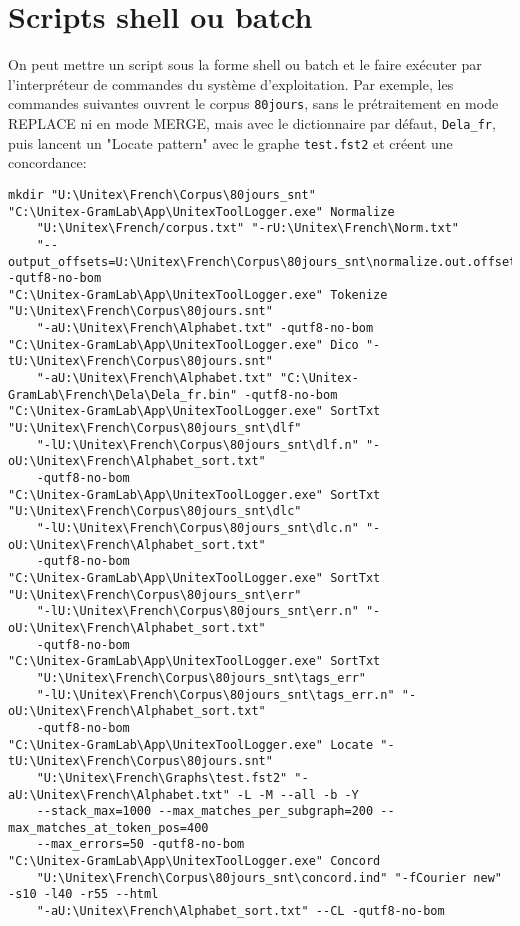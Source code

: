 \section{Scripts shell ou batch}
\label{section-batch}

On peut mettre un script sous la forme shell ou batch et le faire exécuter par l'interpréteur de
commandes du système d'exploitation. Par exemple, les commandes suivantes ouvrent le corpus
\verb$80jours$, sans le prétraitement en mode REPLACE ni en mode MERGE, mais avec le dictionnaire
par défaut, \verb$Dela_fr$, puis lancent un "Locate pattern" avec le graphe \verb$test.fst2$
et créent une concordance:

\begin{Verbatim}[fontsize=\small,fontfamily=helvetica]
mkdir "U:\Unitex\French\Corpus\80jours_snt" 
"C:\Unitex-GramLab\App\UnitexToolLogger.exe" Normalize
    "U:\Unitex\French/corpus.txt" "-rU:\Unitex\French\Norm.txt"
    "--output_offsets=U:\Unitex\French\Corpus\80jours_snt\normalize.out.offsets" -qutf8-no-bom
"C:\Unitex-GramLab\App\UnitexToolLogger.exe" Tokenize "U:\Unitex\French\Corpus\80jours.snt" 
    "-aU:\Unitex\French\Alphabet.txt" -qutf8-no-bom
"C:\Unitex-GramLab\App\UnitexToolLogger.exe" Dico "-tU:\Unitex\French\Corpus\80jours.snt" 
    "-aU:\Unitex\French\Alphabet.txt" "C:\Unitex-GramLab\French\Dela\Dela_fr.bin" -qutf8-no-bom
"C:\Unitex-GramLab\App\UnitexToolLogger.exe" SortTxt "U:\Unitex\French\Corpus\80jours_snt\dlf" 
    "-lU:\Unitex\French\Corpus\80jours_snt\dlf.n" "-oU:\Unitex\French\Alphabet_sort.txt"
    -qutf8-no-bom
"C:\Unitex-GramLab\App\UnitexToolLogger.exe" SortTxt "U:\Unitex\French\Corpus\80jours_snt\dlc" 
    "-lU:\Unitex\French\Corpus\80jours_snt\dlc.n" "-oU:\Unitex\French\Alphabet_sort.txt"
    -qutf8-no-bom
"C:\Unitex-GramLab\App\UnitexToolLogger.exe" SortTxt "U:\Unitex\French\Corpus\80jours_snt\err" 
    "-lU:\Unitex\French\Corpus\80jours_snt\err.n" "-oU:\Unitex\French\Alphabet_sort.txt"
    -qutf8-no-bom
"C:\Unitex-GramLab\App\UnitexToolLogger.exe" SortTxt
    "U:\Unitex\French\Corpus\80jours_snt\tags_err"
    "-lU:\Unitex\French\Corpus\80jours_snt\tags_err.n" "-oU:\Unitex\French\Alphabet_sort.txt"
    -qutf8-no-bom
"C:\Unitex-GramLab\App\UnitexToolLogger.exe" Locate "-tU:\Unitex\French\Corpus\80jours.snt" 
    "U:\Unitex\French\Graphs\test.fst2" "-aU:\Unitex\French\Alphabet.txt" -L -M --all -b -Y
    --stack_max=1000 --max_matches_per_subgraph=200 --max_matches_at_token_pos=400 
    --max_errors=50 -qutf8-no-bom
"C:\Unitex-GramLab\App\UnitexToolLogger.exe" Concord
    "U:\Unitex\French\Corpus\80jours_snt\concord.ind" "-fCourier new" -s10 -l40 -r55 --html 
    "-aU:\Unitex\French\Alphabet_sort.txt" --CL -qutf8-no-bom
\end{Verbatim}

